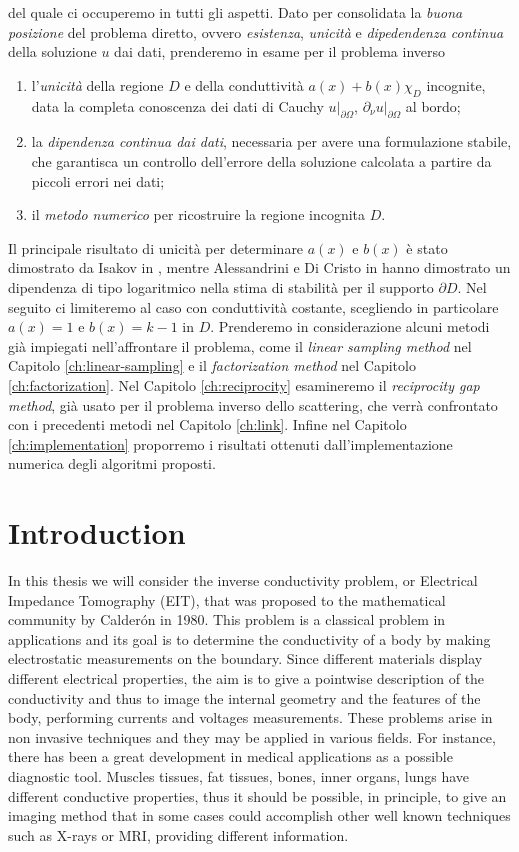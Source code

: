 \documentclass[10pt, a4paper, twoside, openright]{book}
\theoremstyle{definition}
\theoremstyle{plain}
\theoremstyle{plain}
\theoremstyle{plain}
\theoremstyle{plain}
\theoremstyle{plain}
\theoremstyle{plain}
\theoremstyle{plain}
\theoremstyle{plain}
\begin{document}
del quale ci occuperemo in tutti gli aspetti. Dato per consolidata la 
\emph{buona posizione} del problema diretto, ovvero \emph{esistenza}, \emph{unicità} e \emph{dipedendenza 
continua} della soluzione $u$ dai dati, prenderemo in esame per il problema inverso
\begin{enumerate}
 \item l'\emph{unicità} della regione $D$ e della conduttività $a(x) + b(x)\chi_D$ incognite, data 
 la completa conoscenza dei dati di Cauchy $u|_{\partial \Omega}$, 
 $\partial_\nu u|_{\partial \Omega}$ al bordo;
 \item la \emph{dipendenza continua dai dati}, necessaria per avere una formulazione stabile, 
 che garantisca un controllo dell'errore della soluzione calcolata a partire da piccoli errori 
 nei dati;
 \item il \emph{metodo numerico} per ricostruire la regione incognita $D$.
\end{enumerate}
Il principale risultato di unicità per determinare $a(x)$ e $b(x)$ è stato dimostrato da Isakov in \cite{Is88}, 
mentre Alessandrini e Di Cristo in \cite{Al-DC} hanno dimostrato un dipendenza di tipo logaritmico nella 
stima di stabilità per il supporto $\partial D$.
Nel seguito ci limiteremo al caso con conduttività costante, scegliendo in particolare $a(x)=1$ e $b(x)=k-1$ in $D$.
Prenderemo in considerazione alcuni metodi già impiegati nell'affrontare il problema, 
come il \emph{linear sampling method} nel Capitolo \ref{ch:linear-sampling} e il 
\emph{factorization method} nel Capitolo \ref{ch:factorization}. Nel Capitolo \ref{ch:reciprocity} 
esamineremo il \emph{reciprocity gap method}, già usato per il problema inverso dello 
scattering, che verrà confrontato con i precedenti metodi nel Capitolo \ref{ch:link}.
Infine nel Capitolo \ref{ch:implementation} proporremo i risultati ottenuti 
dall'implementazione numerica degli algoritmi proposti.
\chapter{Introduction}
In this thesis we will consider the inverse conductivity problem, or Electrical Impedance Tomography (EIT),
that was proposed to the mathematical community by Calder\'on \cite{Ca} in 1980.
This problem is a classical problem in applications and its goal is to determine the conductivity of a body by making electrostatic
measurements on the boundary. Since different materials display different electrical properties, the aim is to give a pointwise
description of the conductivity and thus to image the internal geometry and the features of the body, performing currents and voltages measurements.
These problems arise in non invasive techniques and they may be applied in various fields. For instance, there has been a
great development in medical applications as a possible diagnostic tool.
Muscles tissues, fat tissues, bones, inner organs, lungs have different conductive properties, thus it should be possible, in principle,
to give an imaging method that in some cases could accomplish other well known techniques such as X-rays or MRI, providing different information.
\end{document}
